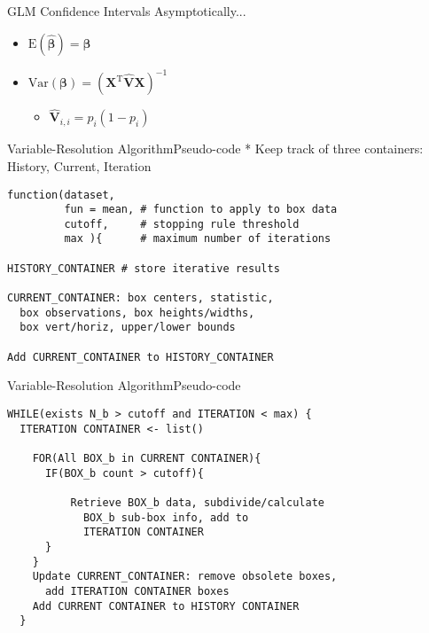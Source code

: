 \documentclass{beamer}
\begin{document}
\begin{frame}{GLM Confidence Intervals}
Asymptotically... \\
\begin{itemize}
\addtolength{\itemsep}{0.8\baselineskip}
\item $\text{E}(\hat{\pmb{\beta}}) = \pmb{\beta}$
\item $\text{Var}(\pmb{\beta}) = (\pmb{X}^{\text{T}}\widehat{\pmb{V}}\pmb{X})^{-1}$ \\
  \begin{itemize}
  \addtolength{\itemsep}{0.8\baselineskip}
  \item $\widehat{\pmb{V}}_{i,i} = p_{i}(1-p_{i})$
  \end{itemize}
\end{itemize}
\end{frame}


\begin{frame}[fragile]{Variable-Resolution Algorithm}{Pseudo-code}
* Keep track of three containers: History, Current, Iteration
\begin{verbatim}
function(dataset,
         fun = mean, # function to apply to box data
         cutoff,     # stopping rule threshold
         max ){      # maximum number of iterations

HISTORY_CONTAINER # store iterative results

CURRENT_CONTAINER: box centers, statistic,
  box observations, box heights/widths,
  box vert/horiz, upper/lower bounds

Add CURRENT_CONTAINER to HISTORY_CONTAINER
\end{verbatim}
\end{frame}

\begin{frame}[fragile]{Variable-Resolution Algorithm}{Pseudo-code}
\begin{verbatim}
WHILE(exists N_b > cutoff and ITERATION < max) {
  ITERATION CONTAINER <- list()

    FOR(All BOX_b in CURRENT CONTAINER){
      IF(BOX_b count > cutoff){

          Retrieve BOX_b data, subdivide/calculate
            BOX_b sub-box info, add to
            ITERATION CONTAINER
      }
    }
    Update CURRENT_CONTAINER: remove obsolete boxes,
      add ITERATION CONTAINER boxes
    Add CURRENT CONTAINER to HISTORY CONTAINER
  }

\end{verbatim}
\end{frame}
\end{document}
